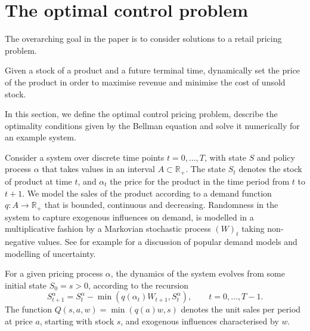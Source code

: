 \documentclass[main.tex]{subfiles}
\begin{document}
\listoftodos

\section{The optimal control problem}
The overarching goal in the paper is to consider solutions to a retail
pricing problem.
\begin{mydef}
  Given a stock of a product and a future terminal time,
  dynamically set the price
  of the product in order to maximise revenue and minimise the cost of
  unsold stock.
\end{mydef}
In this section, we define the optimal control pricing problem,
describe the optimality conditions given by the Bellman equation and
solve it numerically for an example system.

Consider a system over discrete time points $t=0,\dots,T$, with state
$S$ and policy process $\alpha$ that takes values in an
interval $A\subset\mathbb R_+$.
The state $S_t$ denotes the stock of product at time $t$, and
$\alpha_t$ the price for the product in the time period from $t$ to
$t+1$. We model the sales of the product according to a demand
function $q:A\to\mathbb R_+$ that is bounded, continuous and decreasing.
Randomness in the system to capture exogenous influences on demand, is
modelled in a multiplicative fashion by a Markovian stochastic process
$(W)_t$ taking non-negative values. See for example
\citet[Ch.~7]{talluri2006theory} for a discussion of
popular demand models and modelling of uncertainty.

For a given pricing process $\alpha$, the dynamics of
the system evolves from some initial state $S_0=s>0$, according to the
recursion
\begin{equation}\label{eq:stock_dynamics}
  S_{t+1}^\alpha=S_t^\alpha-\min(q(\alpha_t)W_{t+1},S_t^\alpha),\qquad t=0,\dots,T-1.
\end{equation}
The function $Q(s,a,w)=\min(q(a)w,s)$ denotes the unit sales per
period at price $a$,
starting with stock $s$, and exogenous influences
characterised by $w$.
\end{document}
